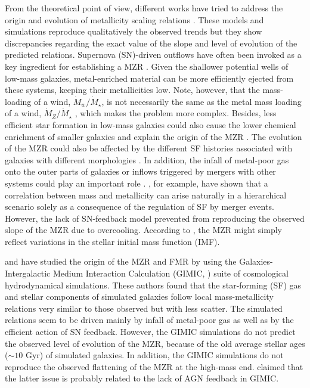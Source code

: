\documentclass[useAMS,usenatbib]{mn2e}
\begin{document}
From the theoretical point of view, different works have tried to address the origin
and evolution of metallicity scaling relations \citep[e.g.][]{tissera2005, 
dave2012, dayal2012, yates2011, lilly2013, romeo2013, yates2013, vogelsberger2014, ma2016, genel2016, weinberg2016}.
These models and simulations reproduce qualitatively the observed trends but
they show discrepancies regarding the exact value of the slope and level of evolution of the
predicted relations.
Supernova (SN)-driven outflows have often been invoked as a key ingredient for establishing a
MZR \citep{larson1974, tremonti2004, dalcanton2007, kobayashi2007}.  Given the shallower
potential wells of low-mass galaxies, metal-enriched material can be more efficiently ejected from
these systems, keeping their metallicities low.
Note, however, that the mass-loading of a wind, $\dot M_w/\dot M_\star$, 
is not necessarily the same as the metal mass loading of a wind, $\dot M_Z/\dot M_\star$
\citep[e.g.][]{maclow1999, creasey2015}, which makes the problem more complex.
Besides, less efficient star formation in low-mass galaxies
could also cause the lower chemical enrichment of smaller galaxies
and explain the origin of the MZR \citep[e.g.][]{brooks2007, mouchine2008, calura2009}.
The evolution of the MZR could also be affected by the different SF histories associated with galaxies 
with different morphologies \citep[see e.g.][]{calura2009}.
In addition, the infall of metal-poor gas onto the outer parts of galaxies or inflows triggered 
by mergers with other
systems could play an important role
\citep[e.g.][]{koppen1999, dalcanton2004, finlator2008, dave2010}.
\citet{derossi2007}, for example, have shown that a correlation between mass and metallicity can arise naturally
in a hierarchical scenario solely as a consequence of the regulation of SF by merger events. 
However, the lack of SN-feedback model prevented \citet{derossi2007} from reproducing the
observed slope of the MZR due to overcooling.
According to \citet{koppen2007}, the MZR might simply reflect 
variations in the stellar initial mass function (IMF).

\citet{derossi2015b,derossi2015} and  \citet{derossi2016} have studied the origin of the MZR and FMR by using   
the Galaxies-Intergalactic Medium Interaction Calculation ({\sc GIMIC}, \citealt{crain2009})
suite of cosmological hydrodynamical simulations.  These authors found that the star-forming (SF) gas
and stellar components of simulated galaxies follow local 
mass-metallicity relations very similar to those observed but with
less scatter.  
The simulated relations seem to be driven mainly
by infall of metal-poor gas as well as by the efficient action of SN feedback.
However, the {\sc GIMIC} simulations do not predict the observed level of
evolution of the MZR, because of the old average stellar ages ($\sim 10$ Gyr) of simulated galaxies.  
In addition, the {\sc GIMIC} simulations do not reproduce the observed flattening of the MZR at
the high-mass end.  \citet{derossi2015} claimed that the latter issue is probably related to
the lack of AGN feedback in {\sc GIMIC}.
\end{document}
